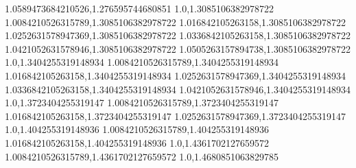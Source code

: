 1.0589473684210526,1.276595744680851
1.0,1.3085106382978722
1.0084210526315789,1.3085106382978722
1.016842105263158,1.3085106382978722
1.0252631578947369,1.3085106382978722
1.0336842105263158,1.3085106382978722
1.0421052631578946,1.3085106382978722
1.0505263157894738,1.3085106382978722
1.0,1.3404255319148934
1.0084210526315789,1.3404255319148934
1.016842105263158,1.3404255319148934
1.0252631578947369,1.3404255319148934
1.0336842105263158,1.3404255319148934
1.0421052631578946,1.3404255319148934
1.0,1.3723404255319147
1.0084210526315789,1.3723404255319147
1.016842105263158,1.3723404255319147
1.0252631578947369,1.3723404255319147
1.0,1.404255319148936
1.0084210526315789,1.404255319148936
1.016842105263158,1.404255319148936
1.0,1.4361702127659572
1.0084210526315789,1.4361702127659572
1.0,1.4680851063829785
